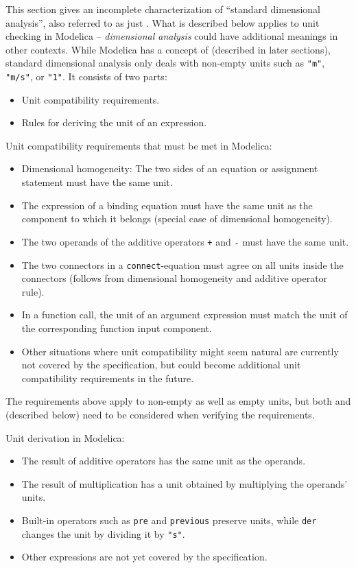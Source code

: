 This section gives an incomplete characterization of ``standard dimensional analysis'', also referred to as just .
What is described below applies to unit checking in Modelica -- \emph{dimensional analysis} could have additional meanings in other contexts.
While Modelica has a concept of  (described in later sections), standard dimensional analysis only deals with non-empty units such as \lstinline!"m"!, \lstinline!"m/s"!, or \lstinline!"1"!.
It consists of two parts:
\begin{itemize}
\item
  Unit compatibility requirements.
\item
  Rules for deriving the unit of an expression.
\end{itemize}

Unit compatibility requirements that must be met in Modelica:
\begin{itemize}
\item
  Dimensional homogeneity: The two sides of an equation or assignment statement must have the same unit.
\item
  The expression of a binding equation must have the same unit as the component to which it belongs (special case of dimensional homogeneity).
\item
  The two operands of the additive operators \lstinline!+! and \lstinline!-! must have the same unit.
\item
  The two connectors in a \lstinline!connect!-equation must agree on all units inside the connectors (follows from dimensional homogeneity and additive operator rule).
\item
  In a function call, the unit of an argument expression must match the unit of the corresponding function input component.
\item
  Other situations where unit compatibility might seem natural are currently not covered by the specification, but could become additional unit compatibility requirements in the future.
\end{itemize}
The requirements above apply to non-empty as well as empty units, but both  and  (described below) need to be considered when verifying the requirements.

Unit derivation in Modelica:
\begin{itemize}
\item
  The result of additive operators has the same unit as the operands.
\item
  The result of multiplication has a unit obtained by multiplying the operands' units.
\item
  Built-in operators such as \lstinline!pre! and \lstinline!previous! preserve units, while \lstinline!der! changes the unit by dividing it by \lstinline!"s"!.
\item
  Other expressions are not yet covered by the specification.
\end{itemize}


